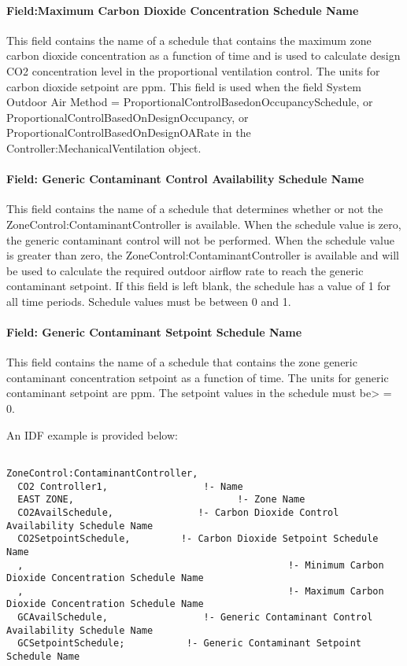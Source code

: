 \paragraph{Field:Maximum Carbon Dioxide Concentration Schedule Name}\label{fieldmaximum-carbon-dioxide-concentration-schedule-name}

This field contains the name of a schedule that contains the maximum zone carbon dioxide concentration as a function of time and is used to calculate design CO2 concentration level in the proportional ventilation control. The units for carbon dioxide setpoint are ppm. This field is used when the field System Outdoor Air Method = ProportionalControlBasedonOccupancySchedule, or ProportionalControlBasedOnDesignOccupancy, or ProportionalControlBasedOnDesignOARate in the Controller:MechanicalVentilation object.

\paragraph{Field: Generic Contaminant Control Availability Schedule Name}\label{field-generic-contaminant-control-availability-schedule-name}

This field contains the name of a schedule that determines whether or not the ZoneControl:ContaminantController is available. When the schedule value is zero, the generic contaminant control will not be performed. When the schedule value is greater than zero, the ZoneControl:ContaminantController is available and will be used to calculate the required outdoor airflow rate to reach the generic contaminant setpoint. If this field is left blank, the schedule has a value of 1 for all time periods. Schedule values must be between 0 and 1.

\paragraph{Field: Generic Contaminant Setpoint Schedule Name}\label{field-generic-contaminant-setpoint-schedule-name}

This field contains the name of a schedule that contains the zone generic contaminant concentration setpoint as a function of time. The units for generic contaminant setpoint are ppm. The setpoint values in the schedule must be\textgreater{} = 0.

An IDF example is provided below:

\begin{lstlisting}

ZoneControl:ContaminantController,
  CO2 Controller1,                 !- Name
  EAST ZONE,                             !- Zone Name
  CO2AvailSchedule,               !- Carbon Dioxide Control Availability Schedule Name
  CO2SetpointSchedule,         !- Carbon Dioxide Setpoint Schedule Name
  ,                                               !- Minimum Carbon Dioxide Concentration Schedule Name
  ,                                               !- Maximum Carbon Dioxide Concentration Schedule Name
  GCAvailSchedule,                 !- Generic Contaminant Control Availability Schedule Name
  GCSetpointSchedule;           !- Generic Contaminant Setpoint Schedule Name
\end{lstlisting}

